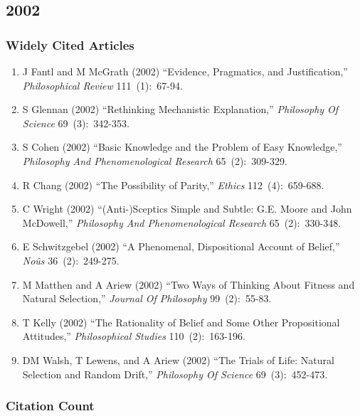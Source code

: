\documentclass[
  10pt,
  letterpaper,
  DIV=11,
  numbers=noendperiod,
  twoside]{scrartcl}
\providecommand{\tightlist}{%
  \setlength{\itemsep}{0pt}\setlength{\parskip}{0pt}}\usepackage{longtable,booktabs,array}
\begin{document}
\newpage

\subsection{2002}\label{sec-s2002}

\subsubsection*{Widely Cited Articles}\label{widely-cited-articles-46}

\begin{enumerate}
\def\labelenumi{\arabic{enumi}.}
\tightlist
\item
  J Fantl and M McGrath (2002) ``Evidence, Pragmatics, and
  Justification,'' \emph{Philosophical Review} 111~(1):~67-94.
\item
  S Glennan (2002) ``Rethinking Mechanistic Explanation,''
  \emph{Philosophy Of Science} 69~(3):~342-353.
\item
  S Cohen (2002) ``Basic Knowledge and the Problem of Easy Knowledge,''
  \emph{Philosophy And Phenomenological Research} 65~(2):~309-329.
\item
  R Chang (2002) ``The Possibility of Parity,'' \emph{Ethics}
  112~(4):~659-688.
\item
  C Wright (2002) ``(Anti-)Sceptics Simple and Subtle: G.E. Moore and
  John McDowell,'' \emph{Philosophy And Phenomenological Research}
  65~(2):~330-348.
\item
  E Schwitzgebel (2002) ``A Phenomenal, Dispositional Account of
  Belief,'' \emph{Noûs} 36~(2):~249-275.
\item
  M Matthen and A Ariew (2002) ``Two Ways of Thinking About Fitness and
  Natural Selection,'' \emph{Journal Of Philosophy} 99~(2):~55-83.
\item
  T Kelly (2002) ``The Rationality of Belief and Some Other
  Propositional Attitudes,'' \emph{Philosophical Studies}
  110~(2):~163-196.
\item
  DM Walsh, T Lewens, and A Ariew (2002) ``The Trials of Life: Natural
  Selection and Random Drift,'' \emph{Philosophy Of Science}
  69~(3):~452-473.
\end{enumerate}

\subsubsection*{Citation Count}\label{sec-count-2002}
\end{document}
